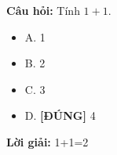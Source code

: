 \documentclass{article}
\newenvironment{ex}{\par\vspace{10pt}\noindent\textbf{Câu hỏi: }}{\par}
\newcommand{\choice}[4]{\begin{itemize} \item A. #1 \item B. #2 \item C. #3 \item D. #4 \end{itemize}}
\newcommand{\True}{\textbf{[ĐÚNG]} }
\newcommand{\loigiai}[1]{\par\noindent\textbf{Lời giải:} #1}
\begin{document}
\begin{ex}
  Tính $1+1$.
  \choice{1}{2}{3}{\True 4}
  \loigiai{1+1=2}
\end{ex}
\end{document}
